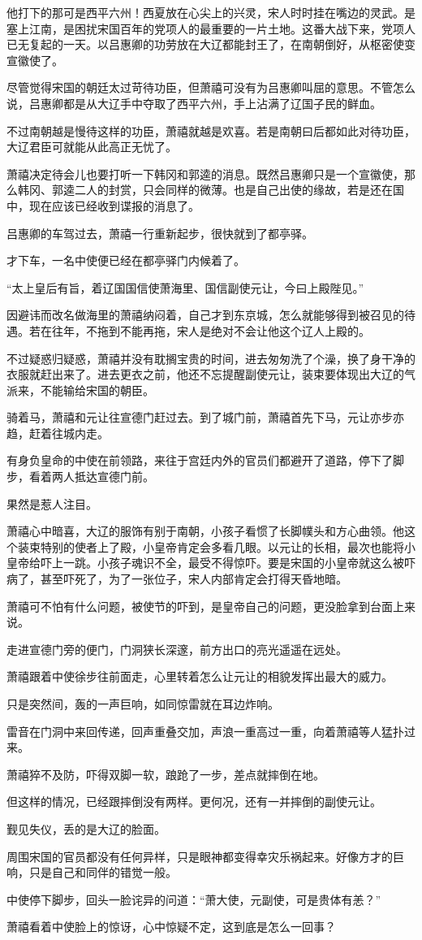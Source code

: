 他打下的那可是西平六州！西夏放在心尖上的兴灵，宋人时时挂在嘴边的灵武。是塞上江南，是困扰宋国百年的党项人的最重要的一片土地。这番大战下来，党项人已无复起的一天。以吕惠卿的功劳放在大辽都能封王了，在南朝倒好，从枢密使变宣徽使了。

尽管觉得宋国的朝廷太过苛待功臣，但萧禧可没有为吕惠卿叫屈的意思。不管怎么说，吕惠卿都是从大辽手中夺取了西平六州，手上沾满了辽国子民的鲜血。

不过南朝越是慢待这样的功臣，萧禧就越是欢喜。若是南朝曰后都如此对待功臣，大辽君臣可就能从此高正无忧了。

萧禧决定待会儿也要打听一下韩冈和郭逵的消息。既然吕惠卿只是一个宣徽使，那么韩冈、郭逵二人的封赏，只会同样的微薄。也是自己出使的缘故，若是还在国中，现在应该已经收到谍报的消息了。

吕惠卿的车驾过去，萧禧一行重新起步，很快就到了都亭驿。

才下车，一名中使便已经在都亭驿门内候着了。

“太上皇后有旨，着辽国国信使萧海里、国信副使元让，今曰上殿陛见。”

因避讳而改名做海里的萧禧纳闷着，自己才到东京城，怎么就能够得到被召见的待遇。若在往年，不拖到不能再拖，宋人是绝对不会让他这个辽人上殿的。

不过疑惑归疑惑，萧禧并没有耽搁宝贵的时间，进去匆匆洗了个澡，换了身干净的衣服就赶出来了。进去更衣之前，他还不忘提醒副使元让，装束要体现出大辽的气派来，不能输给宋国的朝臣。

骑着马，萧禧和元让往宣德门赶过去。到了城门前，萧禧首先下马，元让亦步亦趋，赶着往城内走。

有身负皇命的中使在前领路，来往于宫廷内外的官员们都避开了道路，停下了脚步，看着两人抵达宣德门前。

果然是惹人注目。

萧禧心中暗喜，大辽的服饰有别于南朝，小孩子看惯了长脚幞头和方心曲领。他这个装束特别的使者上了殿，小皇帝肯定会多看几眼。以元让的长相，最次也能将小皇帝给吓上一跳。小孩子魂识不全，最受不得惊吓。要是宋国的小皇帝就这么被吓病了，甚至吓死了，为了一张位子，宋人内部肯定会打得天昏地暗。

萧禧可不怕有什么问题，被使节的吓到，是皇帝自己的问题，更没脸拿到台面上来说。

走进宣德门旁的便门，门洞狭长深邃，前方出口的亮光遥遥在远处。

萧禧跟着中使徐步往前面走，心里转着怎么让元让的相貌发挥出最大的威力。

只是突然间，轰的一声巨响，如同惊雷就在耳边炸响。

雷音在门洞中来回传递，回声重叠交加，声浪一重高过一重，向着萧禧等人猛扑过来。

萧禧猝不及防，吓得双脚一软，踉跄了一步，差点就摔倒在地。

但这样的情况，已经跟摔倒没有两样。更何况，还有一并摔倒的副使元让。

觐见失仪，丢的是大辽的脸面。

周围宋国的官员都没有任何异样，只是眼神都变得幸灾乐祸起来。好像方才的巨响，只是自己和同伴的错觉一般。

中使停下脚步，回头一脸诧异的问道：“萧大使，元副使，可是贵体有恙？”

萧禧看着中使脸上的惊讶，心中惊疑不定，这到底是怎么一回事？

